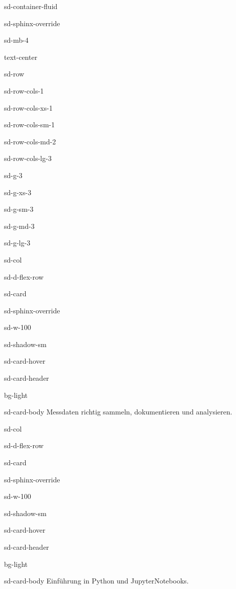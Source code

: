 \documentclass[letterpaper,10pt,english]{jupyterBook}
\begin{document}
\begin{sphinxuseclass}{sd-container-fluid}
\begin{sphinxuseclass}{sd-sphinx-override}
\begin{sphinxuseclass}{sd-mb-4}
\begin{sphinxuseclass}{text-center}
\begin{sphinxuseclass}{sd-row}
\begin{sphinxuseclass}{sd-row-cols-1}
\begin{sphinxuseclass}{sd-row-cols-xs-1}
\begin{sphinxuseclass}{sd-row-cols-sm-1}
\begin{sphinxuseclass}{sd-row-cols-md-2}
\begin{sphinxuseclass}{sd-row-cols-lg-3}
\begin{sphinxuseclass}{sd-g-3}
\begin{sphinxuseclass}{sd-g-xs-3}
\begin{sphinxuseclass}{sd-g-sm-3}
\begin{sphinxuseclass}{sd-g-md-3}
\begin{sphinxuseclass}{sd-g-lg-3}
\begin{sphinxuseclass}{sd-col}
\begin{sphinxuseclass}{sd-d-flex-row}
\begin{sphinxuseclass}{sd-card}
\begin{sphinxuseclass}{sd-sphinx-override}
\begin{sphinxuseclass}{sd-w-100}
\begin{sphinxuseclass}{sd-shadow-sm}
\begin{sphinxuseclass}{sd-card-hover}
\begin{sphinxuseclass}{sd-card-header}
\begin{sphinxuseclass}{bg-light}
\end{sphinxuseclass}
\end{sphinxuseclass}
\begin{sphinxuseclass}{sd-card-body}
\sphinxAtStartPar
Messdaten richtig sammeln, dokumentieren und analysieren.

\end{sphinxuseclass}{\hyperref[\detokenize{content/1_Datenanalyse::doc}]{}}
\end{sphinxuseclass}
\end{sphinxuseclass}
\end{sphinxuseclass}
\end{sphinxuseclass}
\end{sphinxuseclass}
\end{sphinxuseclass}
\end{sphinxuseclass}
\begin{sphinxuseclass}{sd-col}
\begin{sphinxuseclass}{sd-d-flex-row}
\begin{sphinxuseclass}{sd-card}
\begin{sphinxuseclass}{sd-sphinx-override}
\begin{sphinxuseclass}{sd-w-100}
\begin{sphinxuseclass}{sd-shadow-sm}
\begin{sphinxuseclass}{sd-card-hover}
\begin{sphinxuseclass}{sd-card-header}
\begin{sphinxuseclass}{bg-light}
\sphinxAtStartPar
{} 🐍

\end{sphinxuseclass}
\end{sphinxuseclass}
\begin{sphinxuseclass}{sd-card-body}
\sphinxAtStartPar
Einführung in Python und Jupyter\sphinxhyphen{}Notebooks.


\end{sphinxuseclass}
\end{sphinxuseclass}
\end{sphinxuseclass}
\end{sphinxuseclass}
\end{sphinxuseclass}
\end{sphinxuseclass}
\end{sphinxuseclass}
\end{sphinxuseclass}
\end{sphinxuseclass}
\end{sphinxuseclass}
\end{sphinxuseclass}
\end{sphinxuseclass}
\end{sphinxuseclass}
\end{sphinxuseclass}
\end{sphinxuseclass}
\end{sphinxuseclass}
\end{sphinxuseclass}
\end{sphinxuseclass}
\end{sphinxuseclass}
\end{sphinxuseclass}
\end{sphinxuseclass}
\end{sphinxuseclass}
\end{sphinxuseclass}
\end{document}
